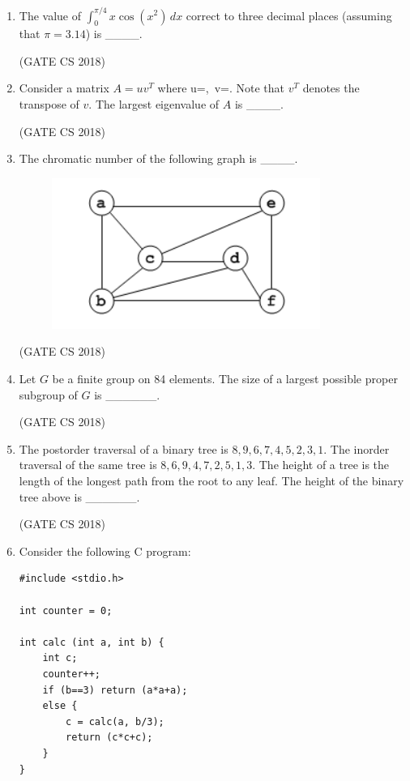 \documentclass[12pt]{article}
\begin{document}
\begin{enumerate}
(GATE CS 2018)

\item The value of $ \displaystyle \int_{0}^{\pi/4} x \cos(x^2)\,dx $ correct to three decimal places (assuming that $ \pi = 3.14 $) is \_\_\_\_.

(GATE CS 2018)

\item Consider a matrix $A = u v^{T}$ where u=,\ v=. Note that $v^{T}$ denotes the transpose of $v$. The largest eigenvalue of $A$ is \_\_\_\_.

(GATE CS 2018)

\item The chromatic number of the following graph is \_\_\_\_. 

\begin{figure}[H]
    \centering
    \includegraphics[width=0.5\columnwidth]{figs/ass6_a_q18.png}
    \caption{}
    \label{fig:placeholder}
\end{figure}

(GATE CS 2018)

\item Let $G$ be a finite group on 84 elements. The size of a largest possible proper subgroup of $G$ is \_\_\_\_\_\_.  

(GATE CS 2018)

\item The postorder traversal of a binary tree is $8,9,6,7,4,5,2,3,1$. The inorder traversal of the same tree is $8,6,9,4,7,2,5,1,3$. The height of a tree is the length of the longest path from the root to any leaf. The height of the binary tree above is \_\_\_\_\_\_.  

(GATE CS 2018)

\item Consider the following C program:
\begin{verbatim}
#include <stdio.h>

int counter = 0;

int calc (int a, int b) {
    int c;
    counter++;
    if (b==3) return (a*a+a);
    else {
        c = calc(a, b/3);
        return (c*c+c);
    }
}


\end{verbatim}
\end{enumerate}
\end{document}

